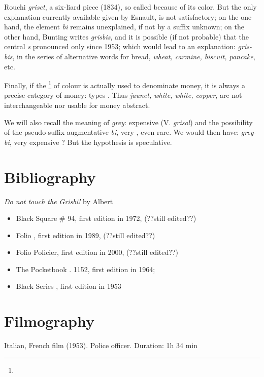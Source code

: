 Rouchi \emph{griset}, \og a six-liard piece \fg{} (1834), so called because of its color. But the only explanation currently available given by Esnault,  is not satisfactory; on the one hand, the element \emph{bi} remains
unexplained, if not by a \og suffix \fg{} unknown; on the other hand, Bunting writes
\emph{grisbis}, and it is possible (if not probable) that the central \emph{s}
pronounced only since 1953; which would lead to an explanation:
\emph{gris-bis}, in the series of alternative words for bread,
\emph{wheat, carmine, biscuit, pancake}, etc.

Finally, if the \footnote{\urlMetonym{}} of colour is actually used to denominate
money, it is always a precise category of money: \og types \fg{}.
Thus \emph{jaunet, white, white, copper}, are not interchangeable nor
usable for \og money \fg{} abstract.

We will also recall the meaning of \emph{grey}: \og expensive \fg{} (V. \emph{grisol}) and the possibility of the pseudo-suffix augmentative \emph{bi}, \og very \fg{} , even rare. We would then have: \emph{grey-bi}, \og very expensive \fg{}? But the hypothesis is speculative.

\section*{Bibliography}

\emph{Do not touch the Grisbi!} by Albert 

\begin{itemize}
\item Black Square \# 94, first edition in 1972, (??still edited??)
\item Folio , first edition in 1989, (??still edited??)
\item Folio Policier, first edition in 2000, (??still edited??)
\item The Pocketbook \No. 1152, first edition in 1964;
\item Black Series , first edition in 1953

\end{itemize}

\section*{Filmography}


Italian, French film (1953). Police officer. Duration: 1h 34 min

